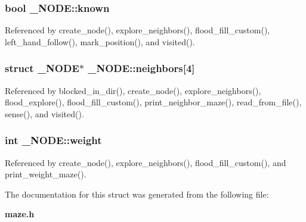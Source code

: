 \subsubsection[{known}]{\setlength{\rightskip}{0pt plus 5cm}bool \-\_\-\-N\-O\-D\-E\-::known}\label{struct__NODE_a5cca231699bb41ced84dcd000bb6c117}


Referenced by create\-\_\-node(), explore\-\_\-neighbors(), flood\-\_\-fill\-\_\-custom(), left\-\_\-hand\-\_\-follow(), mark\-\_\-position(), and visited().

\subsubsection[{neighbors}]{\setlength{\rightskip}{0pt plus 5cm}struct {\bf \-\_\-\-N\-O\-D\-E}$\ast$ \-\_\-\-N\-O\-D\-E\-::neighbors[4]}\label{struct__NODE_ab474f61f2dea616a934f16db645e83b0}


Referenced by blocked\-\_\-in\-\_\-dir(), create\-\_\-node(), explore\-\_\-neighbors(), flood\-\_\-explore(), flood\-\_\-fill\-\_\-custom(), print\-\_\-neighbor\-\_\-maze(), read\-\_\-from\-\_\-file(), sense(), and visited().

\subsubsection[{weight}]{\setlength{\rightskip}{0pt plus 5cm}int \-\_\-\-N\-O\-D\-E\-::weight}\label{struct__NODE_af4551dec0caa61f0b95a8cd025a73afa}


Referenced by create\-\_\-node(), explore\-\_\-neighbors(), flood\-\_\-fill\-\_\-custom(), and print\-\_\-weight\-\_\-maze().



The documentation for this struct was generated from the following file\-:\begin{DoxyCompactItemize}
\item 
{\bf maze.\-h}\end{DoxyCompactItemize}
